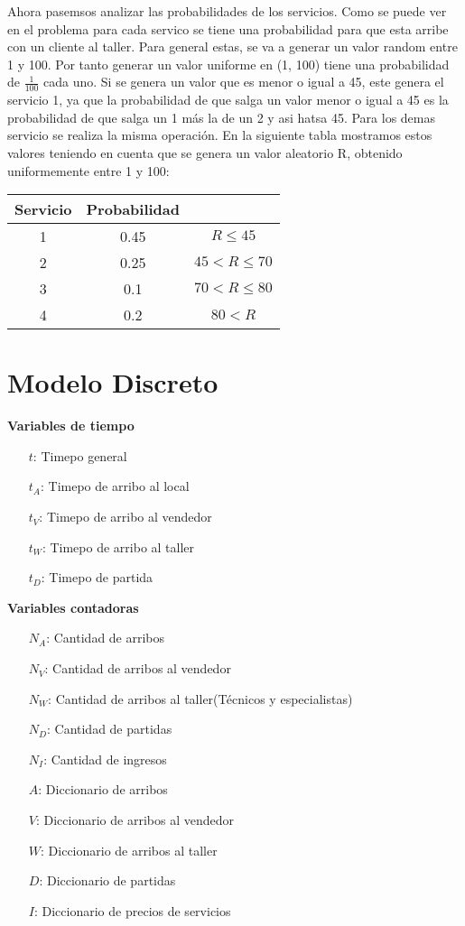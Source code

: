 \documentclass[12pt]{article}
\begin{document}
Ahora pasemsos analizar las probabilidades de los servicios. Como se puede ver en el problema para cada servico se tiene una probabilidad para que esta arribe con un cliente al taller. Para general estas, se va a generar un valor random entre 1 y 100. Por tanto generar un valor uniforme en (1, 100) tiene una probabilidad de $\frac{1}{100}$ cada uno. Si se genera un valor que es menor o igual a 45, este genera el servicio 1, ya que la probabilidad de que salga un valor menor o igual a 45 es la probabilidad de que salga un 1 m\'as la de un 2 y asi hatsa 45. Para los demas servicio se realiza la misma operaci\'on. En la siguiente tabla mostramos estos valores teniendo en cuenta que se genera un valor aleatorio R, obtenido uniformemente entre 1 y 100:\\

\begin{tabular}{c|c|c}
Servicio  & Probabilidad &\\
\hline
1 & 0.45 & $R \leq 45$ \\
2 & 0.25 & $45 < R \leq 70$ \\
3 & 0.1 & $70 < R \leq 80$ \\
4 & 0.2 & $80 < R$
\end{tabular}

\section*{Modelo Discreto}

\noindent \textbf{Variables de tiempo}
\begin{itemize}
        \item[$t$:] Timepo general
        \item[$t_A$:] Timepo de arribo al local
        \item[$t_V$:] Timepo de arribo al vendedor
        \item[$t_W$:] Timepo de arribo al taller
        \item[$t_D$:] Timepo de partida
\end{itemize}

\noindent \textbf{Variables contadoras}
\begin{itemize}
        \item[$N_A$:] Cantidad de arribos
        \item[$N_V$:] Cantidad de arribos al vendedor
        \item[$N_W$:] Cantidad de arribos al taller(T\'ecnicos y especialistas)
        \item[$N_D$:] Cantidad de partidas
        \item[$N_I$:] Cantidad de ingresos
        \item[$A$:] Diccionario de arribos
        \item[$V$:] Diccionario de arribos al vendedor
        \item[$W$:] Diccionario de arribos al taller
        \item[$D$:] Diccionario de partidas
        \item[$I$:] Diccionario de precios de servicios
\end{itemize}
\end{document}
